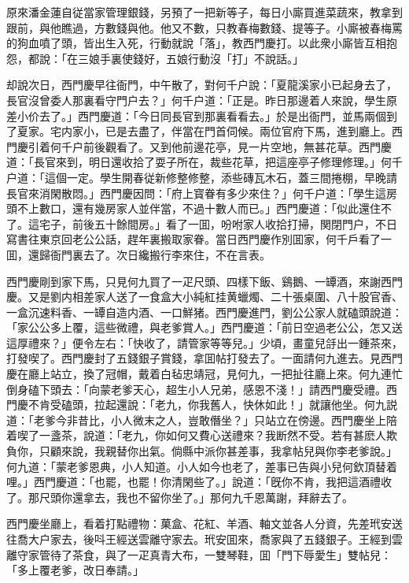 原來潘金蓮自従當家管理銀錢，另預了一把新等子，每日小廝買進菜蔬來，教拿到跟前，與他瞧過，方數錢與他。他又不數，只教春梅數錢、提等子。小廝被春梅罵的狗血噴了頭，皆出生入死，行動就說「落」，教西門慶打。以此衆小廝皆互相抱怨，都說：「在三娘手裏使錢好，五娘行動沒「打」不說話。」

却說次日，西門慶早往衙門，中午散了，對何千户說：「夏龍溪家小已起身去了，長官沒曾委人那裏看守門户去？」何千户道：「正是。昨日那邊着人來說，學生原差小价去了。」西門慶道：「今日同長官到那裏看看去。」於是出衙門，並馬兩個到了夏家。宅内家小，已是去盡了，伴當在門首伺候。兩位官府下馬，進到廳上。西門慶引着何千户前後觀看了。又到他前邊花亭，見一片空地，無甚花草。西門慶道：「長官來到，明日還收拾了耍子所在，裁些花草，把這座亭子修理修理。」何千户道：「這個一定。學生開春従新修整修整，添些磚瓦木石，蓋三間捲棚，早晚請長官來消閑散悶。」西門慶因問：「府上寳眷有多少來住？」何千户道：「學生這房頭不上數口，還有幾房家人並伴當，不過十數人而已。」西門慶道：「似此還住不了。這宅子，前後五十餘間房。」看了一囬，吩咐家人收拾打掃，関閉門户，不日寫書往東京回老公公話，趕年裏搬取家眷。當日西門慶作別囬家，何千戶看了一囬，還歸衙門裏去了。次日纔搬行李來住，不在言表。

西門慶剛到家下馬，只見何九買了一疋尺頭、四樣下飯、鷄鵝、一罈酒，來謝西門慶。又是劉内相差家人送了一食盒大小純紅挂黄蠟燭、二十張桌圍、八十股官香、一盒沉速料香、一罈自造内酒、一口鮮猪。西門慶進門，劉公公家人就磕頭說道：「家公公多上覆，這些微禮，與老爹賞人。」西門慶道：「前日空過老公公，怎又送這厚禮來？」便令左右：「快收了，請管家等等兒。」少頃，畫童兒㧱出一鍾茶來，打發喫了。西門慶封了五錢銀子賞錢，拿囬帖打發去了。一面請何九進去。見西門慶在廳上站立，換了冠帽，戴着白毡忠靖冠，見何九，一把扯往廳上來。何九連忙倒身磕下頭去：「向蒙老爹天心，超生小人兄弟，感恩不淺！」請西門慶受禮。西門慶不肯受磕頭，拉起還說：「老九，你我舊人，快休如此！」就讓他坐。何九説道：「老爹今非昔比，小人微末之人，豈敢僭坐？」只站立在傍邊。西門慶坐上陪着喫了一盞茶，說道：「老九，你如何又費心送禮來？我断然不受。若有甚麽人欺負你，只顧來說，我親替你出氣。倘縣中派你甚差事，我拿帖兒與你李老爹說。」何九道：「蒙老爹恩典，小人知道。小人如今也老了，差事已告與小兒何欽頂替着哩。」西門慶道：「也罷，也罷！你清閑些了。」說道：「旣你不肯，我把這酒禮收了。那尺頭你還拿去，我也不留你坐了。」那何九千恩萬謝，拜辭去了。

西門慶坐廳上，看着打點禮物：菓盒、花紅、羊酒、軸文並各人分資，先差玳安送往喬大户家去，後呌王經送雲離守家去。玳安囬來，喬家與了五錢銀子。王經到雲離守家管待了茶食，與了一疋真青大布，一雙琴鞋，囬「門下辱愛生」雙帖兒：「多上覆老爹，改日奉請。」

